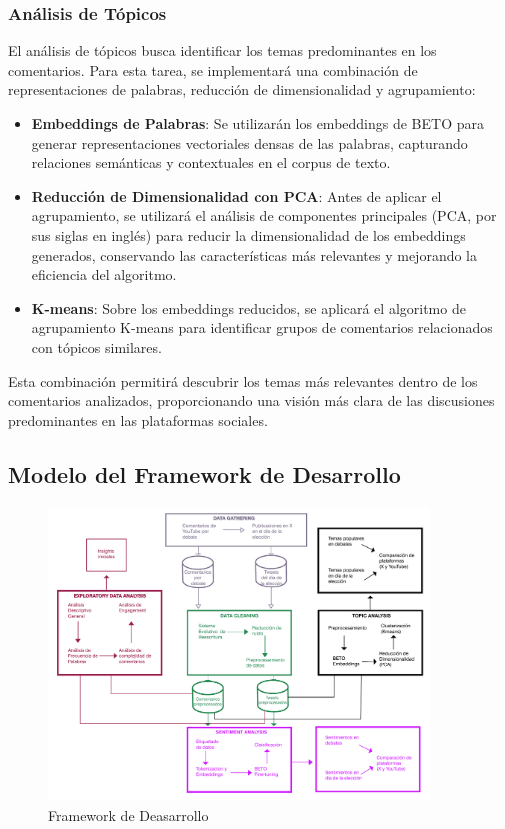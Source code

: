 \documentclass[10pt, a4paper]{article}
\begin{document}
	
	
	\subsubsection{Análisis de Tópicos}
	
	El análisis de tópicos busca identificar los temas predominantes en los comentarios. Para esta tarea, se implementará una combinación de representaciones de palabras, reducción de dimensionalidad y agrupamiento:
	
	\begin{itemize}
		\item \textbf{Embeddings de Palabras}: Se utilizarán los embeddings de BETO para generar representaciones vectoriales densas de las palabras, capturando relaciones semánticas y contextuales en el corpus de texto.
		\item \textbf{Reducción de Dimensionalidad con PCA}: Antes de aplicar el agrupamiento, se utilizará el análisis de componentes principales (PCA, por sus siglas en inglés) para reducir la dimensionalidad de los embeddings generados, conservando las características más relevantes y mejorando la eficiencia del algoritmo.
		\item \textbf{K-means}: Sobre los embeddings reducidos, se aplicará el algoritmo de agrupamiento K-means para identificar grupos de comentarios relacionados con tópicos similares.
	\end{itemize}
	
	Esta combinación permitirá descubrir los temas más relevantes dentro de los comentarios analizados, proporcionando una visión más clara de las discusiones predominantes en las plataformas sociales.
	
	\subsection{Modelo del Framework de Desarrollo}
	
	\begin{figure}[h!] %
		\centering
		\includegraphics[width=0.9\textwidth]{diagrama.pdf} %
		\caption{Framework de Deasarrollo} %
		\label{fig:framework} %
	\end{figure}
	
\end{document}
